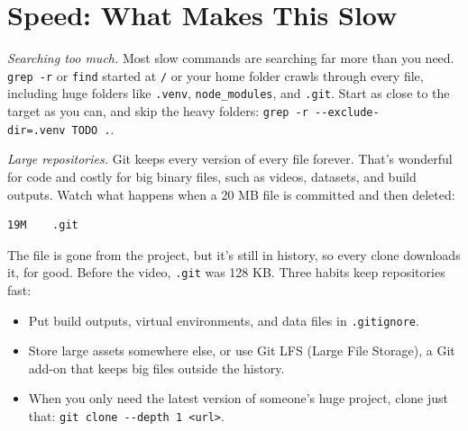 \section{Speed: What Makes This Slow}\label{12-security-speed-failure-and-cost:speed-what-makes-this-slow}

\emph{Searching too much.} Most slow commands are searching far more than you need. \texttt{grep\ -r} or \texttt{find} started at \texttt{/} or your home folder crawls through every file, including huge folders like \texttt{.venv}, \texttt{node\_modules}, and \texttt{.git}. Start as close to the target as you can, and skip the heavy folders: \texttt{grep\ -}\allowbreak{}\texttt{r\ -}\allowbreak{}\texttt{-}\allowbreak{}\texttt{exclude-}\allowbreak{}\texttt{dir=}\allowbreak{}\texttt{.}\allowbreak{}\texttt{venv\ TODO\ .}.

\emph{Large repositories.} Git keeps every version of every file forever. That's wonderful for code and costly for big binary files, such as videos, datasets, and build outputs. Watch what happens when a 20 MB file is committed and then deleted:

\begin{codeblock}

\begin{Shaded}
\begin{Highlighting}[]
 
\end{Highlighting}
\end{Shaded}

\end{codeblock}

\begin{codeblock}
\begin{Verbatim}[formatcom=\outputstyle]
 19M    .git
\end{Verbatim}
\end{codeblock}

The file is gone from the project, but it's still in history, so every clone downloads it, for good. Before the video, \texttt{.git} was 128 KB. Three habits keep repositories fast:

\begin{itemize}
\tightlist
\item
  Put build outputs, virtual environments, and data files in \texttt{.gitignore}.
\item
  Store large assets somewhere else, or use Git LFS (Large File Storage), a Git add-on that keeps big files outside the history.
\item
  When you only need the latest version of someone's huge project, clone just that: \texttt{git\ clone\ -}\allowbreak{}\texttt{-}\allowbreak{}\texttt{depth\ 1\ \textless{}url\textgreater{}}.
\end{itemize}

